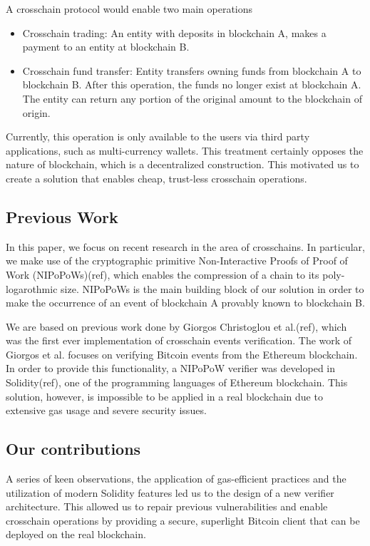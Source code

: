 \documentclass{article}
\begin{document}
  A crosschain protocol would enable two main operations
  \begin{itemize}
  \item
    Crosschain trading: An entity with deposits in blockchain A, makes a
    payment to an entity at blockchain B.
  \item
    Crosschain fund transfer: Entity transfers owning funds from
    blockchain A to blockchain B. After this operation, the funds no
    longer exist at blockchain A. The entity can return any portion of
    the original amount to the blockchain of origin.
  \end{itemize}

  Currently, this operation is only available to the users via third
  party applications, such as multi-currency wallets. This treatment
  certainly opposes the nature of blockchain, which is a decentralized
  construction. This motivated us to create a solution that enables
  cheap, trust-less crosschain operations.

  \subsection{Previous Work}

  In this paper, we focus on recent research in the area of crosschains.
  In particular, we make use of the cryptographic primitive
  Non-Interactive Proofs of Proof of Work (NIPoPoWs)(ref), which enables
  the compression of a chain to its poly-logarothmic size. NIPoPoWs is
  the main building block of our solution in order to make the
  occurrence of an event of blockchain A provably known to blockchain B.

  We are based on previous work done by Giorgos Christoglou et al.(ref),
  which was the first ever implementation of crosschain events
  verification. The work of Giorgos et al. focuses on verifying Bitcoin
  events from the Ethereum blockchain. In order to provide this
  functionality, a NIPoPoW verifier was developed in Solidity(ref), one
  of the programming languages of Ethereum blockchain. This solution,
  however, is impossible to be applied in a real blockchain due to
  extensive gas usage and severe security issues.

  \subsection{Our contributions}

  A series of keen observations, the application of gas-efficient
  practices and the utilization of modern Solidity features led us to
  the design of a new verifier architecture. This allowed us to repair
  previous vulnerabilities and enable crosschain operations by providing
  a secure, superlight Bitcoin client that can be deployed on the real
  blockchain.
\end{document}
